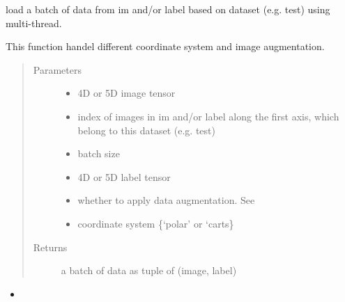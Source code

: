 \documentclass[letterpaper,10pt,english]{sphinxmanual}
\begin{document}

\begin{fulllineitems}
\label{\detokenize{index:util.load_batch.load_batch_parallel}}
load a batch of data from im and/or label based on dataset (e.g. test) using multi-thread.

This function handel different coordinate system and image augmentation.
\begin{quote}\begin{description}
\item[{Parameters}] \leavevmode\begin{itemize}
\item {} 
 \textendash{} 4D or 5D image tensor

\item {} 
 \textendash{} index of images in im and/or label along the first axis, which belong to this dataset (e.g.  test)

\item {} 
 \textendash{} batch size

\item {} 
 \textendash{} 4D or 5D label tensor

\item {} 
 \textendash{} whether to apply data augmentation. See {\hyperref[\detokenize{index:util.load_batch.img_aug}]{}}

\item {} 
 \textendash{} coordinate system \{‘polar’ or ‘carts\}

\end{itemize}

\item[{Returns}] \leavevmode
a batch of data as tuple of (image, label)

\end{description}\end{quote}



\begin{itemize}
\item {} 
{\hyperref[\detokenize{index:util.load_batch.load_batch}]{}}

\end{itemize}



\end{fulllineitems}
\end{document}
